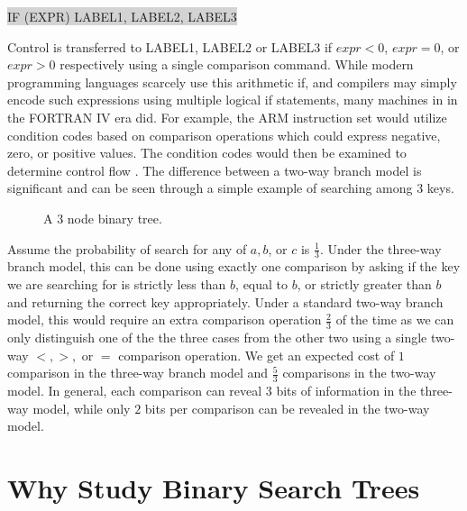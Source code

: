 \documentclass[letterpaper,12pt,titlepage,oneside,final]{book}
\theoremstyle{plain}
\begin{document}
\colorbox{lightgrey}{ \selectfont \uppercase{IF (expr) label1, label2, label3} } 
 
\noindent Control is transferred to \uppercase{label1}, \uppercase{label2} or \uppercase{label3} if $expr < 0$, $expr=0$, or $expr > 0$ respectively using a single comparison command. While modern programming languages scarcely use this arithmetic if, and compilers may simply encode such expressions using multiple logical if statements, many machines in in the FORTRAN IV era did. For example, the ARM instruction set would utilize condition codes based on comparison operations which could express negative, zero, or positive values. The condition codes would then be examined to determine control flow \cite{ARM}. The difference between a two-way branch model is significant and can be seen through a simple example of searching among 3 keys.

\begin{figure}[!ht]
\begin{center}

\caption{A 3 node binary tree.}

\end{center}
\end{figure}

Assume the probability of search for any of $a,b$, or $c$ is $\frac{1}{3}$. Under the three-way branch model, this can be done using exactly one comparison by asking if the key we are searching for is strictly less than $b$, equal to $b$, or strictly greater than $b$ and returning the correct key appropriately. Under a standard two-way branch model, this would require an extra comparison operation $\frac{2}{3}$ of the time as we can only distinguish one of the the three cases from the other two using a single two-way $<, >,$ or $=$ comparison operation. We get an expected cost of $1$ comparison in the three-way branch model and $\frac{5}{3}$ comparisons in the two-way model. In general, each comparison can reveal $3$ bits of information in the three-way model, while only $2$ bits per comparison can be revealed in the two-way model. 

\section{Why Study Binary Search Trees}
\end{document}
